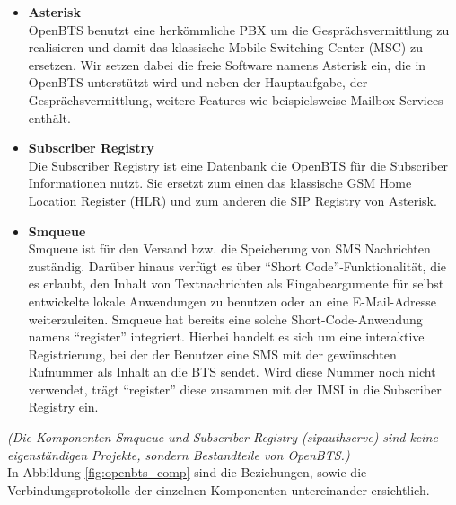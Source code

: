 \begin{itemize}
\item \textbf{Asterisk}\\
OpenBTS benutzt eine herkömmliche PBX um die Gesprächsvermittlung zu realisieren und damit das klassische Mobile Switching Center (MSC) zu ersetzen. Wir setzen dabei die freie Software namens Asterisk ein, die in OpenBTS unterstützt wird und neben der Hauptaufgabe, der Gesprächsvermittlung, weitere Features wie beispielsweise Mailbox-Services enthält. 
\end{itemize}
\begin{itemize}
\item \textbf{Subscriber Registry}\\
Die Subscriber Registry ist eine Datenbank die OpenBTS für die Sub\-scriber Informationen nutzt. Sie ersetzt zum einen das klassische GSM Home Location Register (HLR) und zum anderen die SIP Registry von Asterisk.
\end{itemize}
\begin{itemize}
\item \textbf{Smqueue}\\
Smqueue ist für den Versand bzw. die Speicherung von SMS Nachrichten zuständig. Darüber hinaus verfügt es über "`Short Code"'-Funktionalität, die es erlaubt, den Inhalt von Textnachrichten als Eingabeargumente für selbst entwickelte lokale Anwendungen zu benutzen oder an eine E-Mail-Adresse weiterzuleiten.
Smqueue hat bereits eine solche Short-Code-Anwendung namens "`register"' integriert. Hierbei handelt es sich um eine interaktive Registrierung, bei der der Benutzer eine SMS mit der gewünschten Rufnummer als Inhalt an die BTS sendet. Wird diese Nummer noch nicht verwendet, trägt "`register"' diese zusammen mit der IMSI in die Subscriber Registry ein. %
\end{itemize}

\textit{(Die Komponenten Smqueue und Subscriber Registry (sipauthserve) sind keine eigenständigen Projekte, sondern Bestandteile von OpenBTS.)}\\

In Abbildung \ref{fig:openbts_comp} sind die Beziehungen, sowie die Verbindungsprotokolle der einzelnen Komponenten untereinander ersichtlich.

